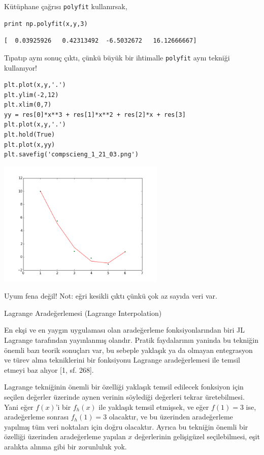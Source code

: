 \documentclass[12pt,fleqn]{article}\usepackage{../../common}
\begin{document}
Kütüphane çağrısı \verb!polyfit! kullanırsak,

\begin{verbatim}
print np.polyfit(x,y,3)
\end{verbatim}

\begin{verbatim}
[  0.03925926   0.42313492  -6.5032672   16.12666667]
\end{verbatim}

Tıpatıp aynı sonuç çıktı, çünkü büyük bir ihtimalle \verb!polyfit! aynı
tekniği kullanıyor! 

\begin{verbatim}
plt.plot(x,y,'.')
plt.ylim(-2,12)
plt.xlim(0,7)
yy = res[0]*x**3 + res[1]*x**2 + res[2]*x + res[3]
plt.plot(x,y,'.')
plt.hold(True)
plt.plot(x,yy)
plt.savefig('compscieng_1_21_03.png')
\end{verbatim}

\includegraphics[height=6cm]{compscieng_1_21_03.png}

Uyum fena değil! Not: eğri kesikli çıktı çünkü çok az sayıda veri var. 

Lagrange Aradeğerlemesi (Lagrange Interpolation)

En ekşi ve en yaygın uygulaması olan aradeğerleme fonksiyonlarından biri JL
Lagrange tarafından yayınlanmış olandır. Pratik faydalarının yaninda bu tekniğin
önemli bazı teorik sonuçları var, bu sebeple yaklaşık ya da olmayan entegrasyon
ve türev alma tekniklerini bir fonksiyonu Lagrange aradeğerlemesi ile temsil
etmeyi baz alıyor [1, sf. 268].

Lagrange tekniğinin önemli bir özelliği yaklaşık temsil edilecek fonksiyon için
seçilen değerler üzerinde aynen verinin söylediği değerleri tekrar
üretebilmesi. Yani eğer $f(x)$'i bir $f_h(x)$ ile yaklaşık temsil etmişsek, ve
eğer $f(1) = 3$ ise, aradeğerleme sonrası $f_h(1) = 3$ olacaktır, ve bu
üzerinden aradeğerleme yapılmış tüm veri noktaları için doğru olacaktır.
Ayrıca bu tekniğin önemli bir özelliği üzerinden aradeğerleme yapılan $x$
değerlerinin gelişigüzel seçilebilmesi, eşit aralıkta alınma gibi bir
zorunluluk yok.
\end{document}
